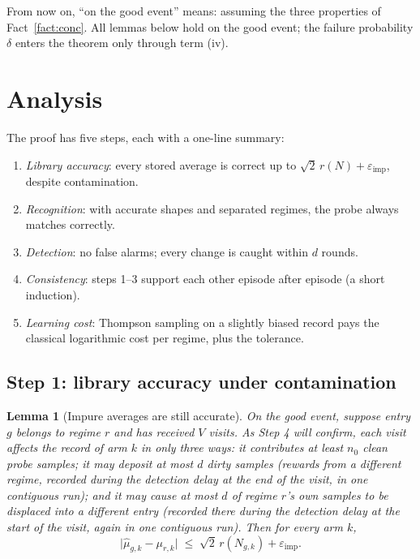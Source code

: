 \documentclass[11pt]{article}
\newtheorem{lemma}{Lemma}
\newcommand{\eimp}{\varepsilon_{\mathrm{imp}}}
\begin{document}
From now on, ``on the good event'' means: assuming the three properties of Fact~\ref{fact:conc}. All lemmas below hold on the good event; the failure probability $\delta$ enters the theorem only through term (iv).

\section{Analysis}

The proof has five steps, each with a one-line summary:
\begin{enumerate}[leftmargin=1.8em,itemsep=1pt]
\item \emph{Library accuracy}: every stored average is correct up to $\sqrt2\,r(N)+\eimp$, despite contamination.
\item \emph{Recognition}: with accurate shapes and separated regimes, the probe always matches correctly.
\item \emph{Detection}: no false alarms; every change is caught within $d$ rounds.
\item \emph{Consistency}: steps 1--3 support each other episode after episode (a short induction).
\item \emph{Learning cost}: Thompson sampling on a slightly biased record pays the classical logarithmic cost per regime, plus the tolerance.
\end{enumerate}

\subsection{Step 1: library accuracy under contamination}

\begin{lemma}[Impure averages are still accurate]
\label{lem:impure}
On the good event, suppose entry $g$ belongs to regime $r$ and has received $V$ visits. As Step 4 will confirm, each visit affects the record of arm $k$ in only three ways: it contributes at least $n_0$ clean probe samples; it may deposit at most $d$ \emph{dirty} samples (rewards from a different regime, recorded during the detection delay at the \emph{end} of the visit, in one contiguous run); and it may cause at most $d$ of regime $r$'s own samples to be \emph{displaced} into a different entry (recorded there during the detection delay at the \emph{start} of the visit, again in one contiguous run). Then for every arm $k$,
\begin{equation}
    \bigl|\widehat\mu_{g,k}-\mu_{r,k}\bigr|
    \;\le\;
    \sqrt2\,r(N_{g,k})+\eimp .
    \label{eq:impure}
\end{equation}
\end{lemma}
\end{document}
